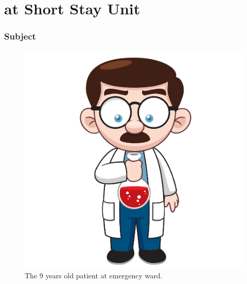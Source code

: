 \documentclass[10pt]{beamer}
\begin{document}

\section{at Short Stay Unit}

{
\begin{frame}
	\frametitle{Subject}
	\begin{figure}
		\includegraphics[scale=0.14]{scientist-t}
		\caption{The 9 years old patient at emergency ward.}
	\end{figure}
\end{frame}
}
\end{document}
